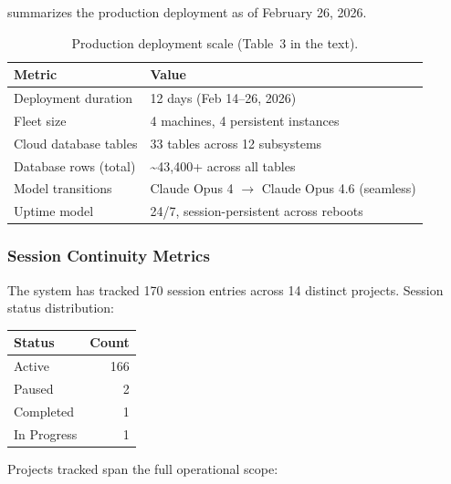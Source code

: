 \documentclass[11pt,a4paper]{article}
\begin{document}
 summarizes the production deployment as of February 26, 2026.

\begin{table}[htbp]
\centering
\caption{Production deployment scale (Table~3 in the text).}
\label{tab:scale}
\small
\begin{tabular}{@{}ll@{}}
\toprule
\textbf{Metric} & \textbf{Value} \\
\midrule
Deployment duration         & 12 days (Feb 14--26, 2026) \\
Fleet size                  & 4 machines, 4 persistent instances \\
Cloud database tables       & 33 tables across 12 subsystems \\
Database rows (total)       & \textasciitilde43,400+ across all tables \\
Model transitions           & Claude Opus 4 $\to$ Claude Opus 4.6 (seamless) \\
Uptime model                & 24/7, session-persistent across reboots \\
\bottomrule
\end{tabular}
\end{table}


\subsubsection{Session Continuity Metrics}

The system has tracked 170 session entries across 14 distinct projects. Session status distribution:

\begin{table}[htbp]
\centering
\small
\begin{tabular}{@{}lr@{}}
\toprule
\textbf{Status} & \textbf{Count} \\
\midrule
Active      & 166 \\
Paused      & 2 \\
Completed   & 1 \\
In Progress & 1 \\
\bottomrule
\end{tabular}
\end{table}

Projects tracked span the full operational scope:
\end{document}
